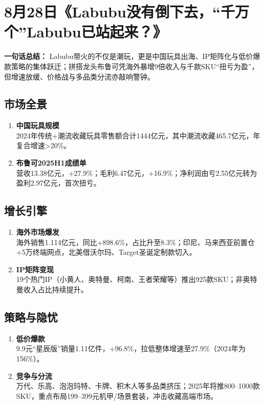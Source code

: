 \section{8月28日《Labubu没有倒下去，“千万个”Labubu已站起来？》}
\textbf{一句话总结：}  
Labubu带火的不仅是潮玩，更是中国玩具出海、IP矩阵化与低价爆款策略的集体跃迁；拼搭龙头布鲁可凭海外暴增9倍收入与千款SKU“扭亏为盈”，但增速放缓、价格战与多品类分流亦敲响警钟。
\subsection{市场全景}
\begin{enumerate}[leftmargin=*, nosep]
    \item \textbf{中国玩具规模}  \\
    2024年传统+潮流收藏玩具零售额合计1444亿元，其中潮流收藏465.7亿元，年复合增速>20\%。
    \item \textbf{布鲁可2025H1成绩单}  \\
    营收13.38亿元，+27.9\%；毛利6.47亿元，+16.9\%；净利润由亏2.55亿元转为盈利2.97亿元，首次扭亏。
\end{enumerate}

\subsection{增长引擎}
\begin{enumerate}[leftmargin=*, nosep]
    \item \textbf{海外市场爆发}  \\
    海外销售1.114亿元，同比+898.6\%，占比升至8.3\%；印尼、马来西亚前置仓+5万终端网点，北美借沃尔玛、Target圣诞定制款切入。
    \item \textbf{IP矩阵变现}  \\
    19个热门IP（小黄人、奥特曼、柯南、王者荣耀等）推出925款SKU；非奥特曼收入占比持续提升。
\end{enumerate}

\subsection{策略与隐忧}
\begin{enumerate}[leftmargin=*, nosep]
    \item \textbf{低价爆款}  \\
    9.9元“星辰版”销量1.11亿件，+96.8\%，拉低整体增速至27.9\%（2024年为156\%）。
    \item \textbf{竞争与分流}  \\
    万代、乐高、泡泡玛特、卡牌、积木人等多品类挤压；2025年将推800–1000款SKU，重点布局199–399元机甲/场景套装，冲击收藏高端市场。
\end{enumerate}

